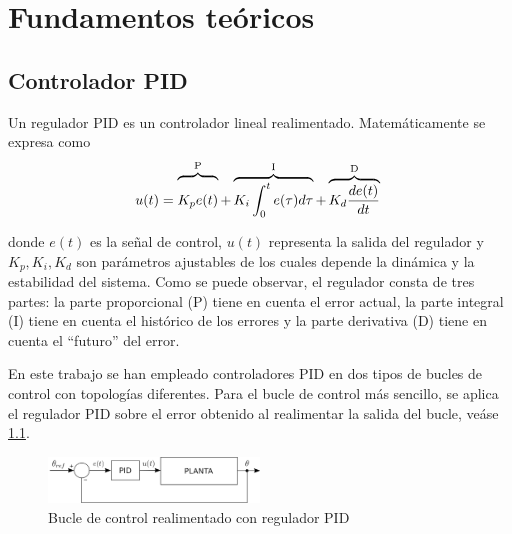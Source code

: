 \chapter{Fundamentos teóricos}







\section{Controlador PID}

Un regulador PID es un controlador lineal realimentado. Matemáticamente se expresa como 
\begin{equation}
	u(t) = \overbrace{\raisebox{0ex}[2.2\height]{$K_p e(t)$}}^\text{P} +\overbrace{K_i \int_{0}^{t}e(\tau)d\tau}^\text{I} + \overbrace{ K_d \frac{de(t)}{dt}}^\text{D}\;
\end{equation}

donde $e(t)$ es la señal de control, $u(t)$ representa la salida del regulador y $K_p,K_i,K_d$ son parámetros ajustables de los cuales depende la dinámica y la estabilidad del sistema. Como se puede observar, el regulador consta de tres partes: la parte proporcional (P) tiene en cuenta el error actual, la parte integral (I) tiene en cuenta el histórico de los errores y la parte derivativa (D) tiene en cuenta el ``futuro'' del error.

En este trabajo se han empleado controladores PID en dos tipos de bucles de control con topologías diferentes. Para el bucle de control más sencillo, se aplica el regulador PID sobre el error obtenido al realimentar la salida del bucle, veáse \cref{PID_loop}.

\begin{figure}[htb!]
	\centering
	\includegraphics[width=0.5\textwidth]{background/PID_loop}
	\caption{Bucle de control realimentado con regulador PID}
	\label{PID_loop}
\end{figure}


